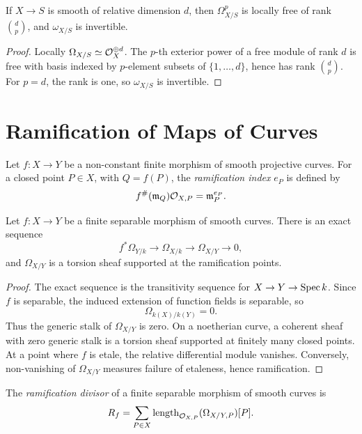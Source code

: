 \begin{proposition}
If \(X\to S\) is smooth of relative dimension \(d\), then
\(\Omega^p_{X/S}\) is locally free of rank \(\binom{d}{p}\), and
\(\omega_{X/S}\) is invertible.
\end{proposition}

\begin{proof}
Locally \(\Omega_{X/S}\simeq\mathcal{O}_X^{\oplus d}\).  The \(p\)-th exterior power of
a free module of rank \(d\) is free with basis indexed by \(p\)-element subsets
of \(\{1,\ldots,d\}\), hence has rank \(\binom{d}{p}\).  For \(p=d\), the rank
is one, so \(\omega_{X/S}\) is invertible.
\end{proof}

\section{Ramification of Maps of Curves}

\begin{definition}
Let \(f:X\to Y\) be a non-constant finite morphism of smooth projective curves.
For a closed point \(P\in X\), with \(Q=f(P)\), the \emph{ramification index}
\(e_P\) is defined by
\[
    f^\#(\mathfrak m_Q)\mathcal{O}_{X,P}=\mathfrak m_P^{e_P}.
\]
\end{definition}

\begin{proposition}
Let \(f:X\to Y\) be a finite separable morphism of smooth curves.  There is an
exact sequence
\[
    f^*\Omega_{Y/k}\longrightarrow \Omega_{X/k}
    \longrightarrow \Omega_{X/Y}\longrightarrow0,
\]
and \(\Omega_{X/Y}\) is a torsion sheaf supported at the ramification points.
\end{proposition}

\begin{proof}
The exact sequence is the transitivity sequence for
\(X\to Y\to\operatorname{Spec} k\).  Since \(f\) is separable, the induced extension of
function fields is separable, so
\[
    \Omega_{k(X)/k(Y)}=0.
\]
Thus the generic stalk of \(\Omega_{X/Y}\) is zero.  On a noetherian curve, a
coherent sheaf with zero generic stalk is a torsion sheaf supported at finitely
many closed points.  At a point where \(f\) is etale, the relative differential
module vanishes.  Conversely, non-vanishing of \(\Omega_{X/Y}\) measures
failure of etaleness, hence ramification.
\end{proof}

\begin{definition}
The \emph{ramification divisor} of a finite separable morphism of smooth curves
is
\[
    R_f=\sum_{P\in X}\operatorname{length}_{\mathcal{O}_{X,P}}(\Omega_{X/Y,P})[P].
\]
\end{definition}

